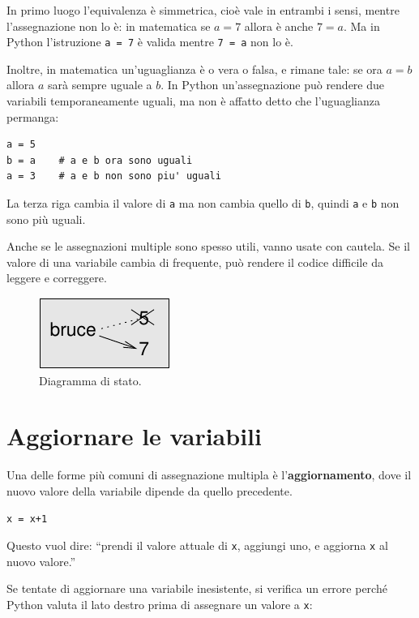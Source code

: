 \documentclass[10pt]{book}
\begin{document}
In primo luogo l'equivalenza è simmetrica, cioè vale in entrambi i sensi, mentre l'assegnazione non lo è: in matematica se $a=7$ allora è anche $7=a$. Ma in Python l'istruzione {\tt a = 7} è valida mentre {\tt 7 = a} non lo è.

Inoltre, in matematica un'uguaglianza è o vera o falsa, e rimane tale: se ora $a=b$ allora $a$ sarà sempre uguale a $b$.
In Python un'assegnazione può rendere due variabili temporaneamente uguali, ma non è affatto detto che l'uguaglianza permanga:

\begin{verbatim}
a = 5
b = a    # a e b ora sono uguali
a = 3    # a e b non sono piu' uguali
\end{verbatim}
%
La terza riga cambia il valore di {\tt a} ma non cambia quello di {\tt b}, quindi {\tt a} e {\tt b} non sono più uguali.

Anche se le assegnazioni multiple sono spesso utili, vanno usate con cautela. Se il valore di una variabile cambia di frequente, può rendere il codice difficile da leggere e correggere.

\begin{figure}
\centerline
{\includegraphics[scale=0.8]{figs/assign2.pdf}}
\caption{Diagramma di stato.}
\label{fig.assign2}
\end{figure}



\section{Aggiornare le variabili}
\label{update}


Una delle forme più comuni di assegnazione multipla è l'{\bf aggiornamento},
dove il nuovo valore della variabile dipende da quello precedente.

\begin{verbatim}
x = x+1
\end{verbatim}
%
Questo vuol dire: ``prendi il valore attuale di {\tt x}, aggiungi uno, e aggiorna {\tt x} al nuovo valore.''

Se tentate di aggiornare una variabile inesistente, si verifica un errore perché Python valuta il lato destro prima di assegnare un valore a {\tt x}:
\end{document}
